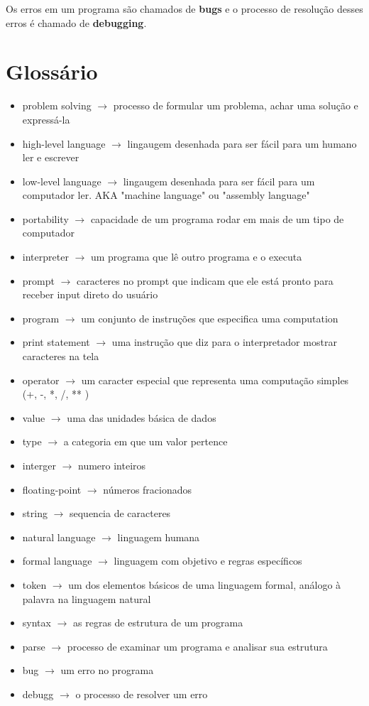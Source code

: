 \documentclass[a4paper,11pt]{book}
\begin{document}
Os erros em um programa são chamados de \textbf{bugs} e o processo de resolução desses erros é chamado de \textbf{debugging}.

\section{Glossário}
\begin{itemize}
	\item problem solving $\rightarrow$ processo de formular um problema, achar uma solução e expressá-la
	\item high-level language $\rightarrow$ lingaugem desenhada para ser fácil para um humano ler e escrever
	\item low-level language $\rightarrow$ lingaugem desenhada para ser fácil para um computador ler. AKA "machine language" ou "assembly language"
	\item portability $\rightarrow$ capacidade de um programa rodar em mais de um tipo de computador
	\item interpreter $\rightarrow$ um programa que lê outro programa e o executa
	\item prompt $\rightarrow$ caracteres no prompt que indicam que ele está pronto para receber input direto do usuário
	\item program $\rightarrow$ um conjunto de instruções que especifica uma computation
	\item print statement $\rightarrow$ uma instrução que diz para o interpretador mostrar caracteres na tela
	\item operator $\rightarrow$ um caracter especial que representa uma computação simples (+, -, *, /, ** ) 
	\item value $\rightarrow$ uma das unidades básica de dados
	\item type $\rightarrow$ a categoria em que um valor pertence
	\item interger $\rightarrow$ numero inteiros
	\item floating-point $\rightarrow$ números fracionados
	\item string $\rightarrow$ sequencia de caracteres
	\item natural language $\rightarrow$ linguagem humana
	\item formal language $\rightarrow$ linguagem com objetivo e regras específicos
	\item token $\rightarrow$ um dos elementos básicos de uma linguagem formal, análogo à palavra na linguagem natural
	\item syntax $\rightarrow$ as regras de estrutura de um programa
	\item parse $\rightarrow$ processo de examinar um programa e analisar sua estrutura
	\item bug $\rightarrow$ um erro no programa
	\item debugg $\rightarrow$ o processo de resolver um erro
\end{itemize}
\end{document}
